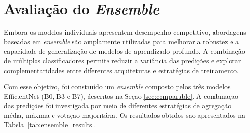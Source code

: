 \begin{table}[!htb]
	\centering
	\caption{Comparação de desempenho entre as arquiteturas da família EfficientNet, utilizando a configuração experimental proposta.}
	\label{tab:comparacao_arquiteturas}
\end{table}

\section{Avaliação do \textit{Ensemble}}

Embora os modelos individuais apresentem desempenho competitivo, abordagens baseadas em \textit{ensemble} são amplamente utilizadas para melhorar a robustez e a capacidade de generalização de modelos de aprendizado profundo. A combinação de múltiplos classificadores permite reduzir a variância das predições e explorar complementaridades entre diferentes arquiteturas e estratégias de treinamento.

Com esse objetivo, foi construído um \textit{ensemble} composto pelos três modelos EfficientNet (B0, B3 e B7), descritos na Seção \ref{sec:comparable}. A combinação das predições foi investigada por meio de diferentes estratégias de agregação: média, máxima e votação majoritária. Os resultados obtidos são apresentados na Tabela~\ref{tab:ensemble_results}.

